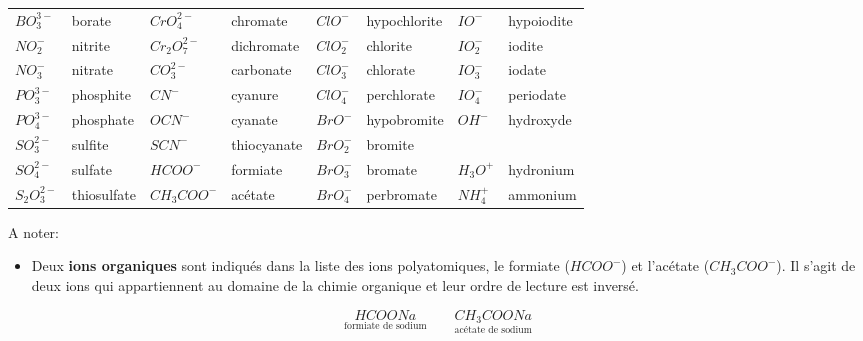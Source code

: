 \documentclass[
  11pt,
  a4paper,
  openany]{book}
\providecommand{\tightlist}{%
  \setlength{\itemsep}{0pt}\setlength{\parskip}{0pt}}
\begin{document}
\begin{longtable}[]{@{}
  >{\raggedright\arraybackslash}p{}
  >{\raggedright\arraybackslash}p{}
  >{\raggedright\arraybackslash}p{}
  >{\raggedright\arraybackslash}p{}
  >{\raggedright\arraybackslash}p{}
  >{\raggedright\arraybackslash}p{}
  >{\raggedright\arraybackslash}p{}
  >{\raggedright\arraybackslash}p{}@{}}
\toprule\noalign{}
\endhead
\bottomrule\noalign{}
\endlastfoot
\(BO_3^{3-}\) & borate & \(CrO_4^{2-}\) & chromate & \(ClO^{-}\) & hypochlorite & \(IO^{-}\) & hypoiodite \\
\(NO_2^{-}\) & nitrite & \(Cr_2O_7^{2-}\) & dichromate & \(ClO_2^{-}\) & chlorite & \(IO_2^{-}\) & iodite \\
\(NO_3^{-}\) & nitrate & \(CO_3^{2-}\) & carbonate & \(ClO_3^{-}\) & chlorate & \(IO_3^{-}\) & iodate \\
\(PO_3^{3-}\) & phosphite & \(CN^{-}\) & cyanure & \(ClO_4^{-}\) & perchlorate & \(IO_4^{-}\) & periodate \\
\(PO_4^{3-}\) & phosphate & \(OCN^{-}\) & cyanate & \(BrO^{-}\) & hypobromite & \(OH^{-}\) & hydroxyde \\
\(SO_3^{2-}\) & sulfite & \(SCN^{-}\) & thiocyanate & \(BrO_2^{-}\) & bromite & & \\
\(SO_4^{2-}\) & sulfate & \(HCOO^{-}\) & formiate & \(BrO_3^{-}\) & bromate & \(H_3O^{+}\) & hydronium \\
\(S_2O_3^{2-}\) & thiosulfate & \(CH_3COO^{-}\) & acétate & \(BrO_4^{-}\) & perbromate & \(NH_4^{+}\) & ammonium \\
\end{longtable}

A noter:

\begin{itemize}
\tightlist
\item
  Deux \textbf{ions organiques} sont indiqués dans la liste des ions polyatomiques, le formiate (\(HCOO^-\)) et l'acétate (\(CH_3COO^-\)). Il s'agit de deux ions qui appartiennent au domaine de la chimie organique et leur ordre de lecture est inversé.
\end{itemize}

\[ \underset{\text{formiate de sodium}}{HCOONa} \qquad \underset{\text{acétate de sodium}}{CH_3COONa} \]
\end{document}
